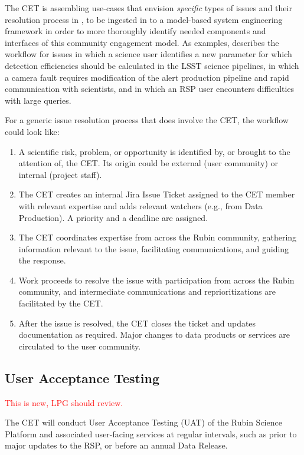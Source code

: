 \documentclass[DM,lsstdraft,toc]{lsstdoc}
\begin{document}
The CET is assembling use-cases that envision \textit{specific} types of issues and their resolution process in , to be ingested in to a model-based system engineering framework in order to more thoroughly identify needed components and interfaces of this community engagement model.
As examples,  describes the workflow for issues in which a science user identifies a new parameter for which detection efficiencies should be calculated in the LSST science pipelines, in which a camera fault requires modification of the alert production pipeline and rapid communication with scientists, and in which an RSP user encounters difficulties with large queries. 

For a generic issue resolution process that does involve the CET, the workflow could look like:
\begin{enumerate}
\item A scientific risk, problem, or opportunity is identified by, or brought to the attention of, the CET. Its origin could be external (user community) or internal (project staff).
\item The CET creates an internal Jira Issue Ticket assigned to the CET member with relevant expertise and adds relevant watchers (e.g., from Data Production). A priority and a deadline are assigned. 
\item The CET coordinates expertise from across the Rubin community, gathering information relevant to the issue, facilitating communications, and guiding the response.
\item Work proceeds to resolve the issue with participation from across the Rubin community, and intermediate communications and reprioritizations are facilitated by the CET.
\item After the issue is resolved, the CET closes the ticket and updates documentation as required. Major changes to data products or services are circulated to the user community.
\end{enumerate}


\subsection{User Acceptance Testing}\label{ssec:mod_uat}

\textcolor{red}{This is new, LPG should review.}

The CET will conduct User Acceptance Testing (UAT) of the Rubin Science Platform and associated user-facing services at regular intervals, such as prior to major updates to the RSP, or before an annual Data Release.
\end{document}
